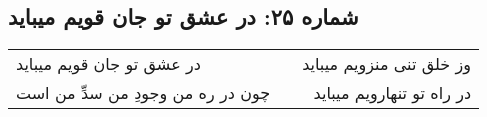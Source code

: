 \begin{center}
\section*{شماره ۲۵: در عشق تو جان قویم میباید}
\label{sec:025}
\begin{longtable}{l p{0.5cm} r}
در عشق تو جان قویم میباید
&&
وز خلق تنی منزویم میباید
\\
چون در ره من وجودِ من سدِّ من است
&&
در راه تو تنهارویم میباید
\\
\end{longtable}
\end{center}
